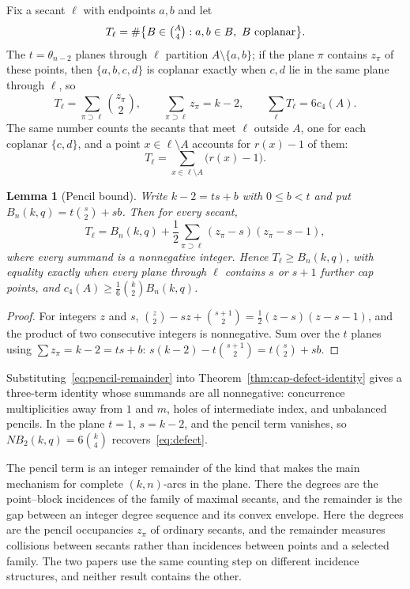 \documentclass[11pt]{article}
\newtheorem{lemma}[theorem]{Lemma}
\theoremstyle{definition}
\theoremstyle{remark}
\begin{document}
Fix a secant $\ell$ with endpoints $a,b$ and let
\[
 T_\ell=\#\bigl\{B\in\tbinom A4:a,b\in B,\ B\text{ coplanar}\bigr\}.
\]
The $t=\theta_{n-2}$ planes through $\ell$ partition $A\setminus\{a,b\}$;
if the plane $\pi$ contains $z_\pi$ of these points, then
$\{a,b,c,d\}$ is coplanar exactly when $c,d$ lie in the same plane through
$\ell$, so
\begin{equation}
 T_\ell=\sum_{\pi\supset\ell}\binom{z_\pi}2,
 \qquad
 \sum_{\pi\supset\ell}z_\pi=k-2,
 \qquad
 \sum_\ell T_\ell=6c_4(A).
\label{eq:pencil}
\end{equation}
The same number counts the secants that meet $\ell$ outside $A$, one for
each coplanar $\{c,d\}$, and a point $x\in\ell\setminus A$ accounts for
$r(x)-1$ of them:
\begin{equation}
 T_\ell=\sum_{x\in\ell\setminus A}\bigl(r(x)-1\bigr).
\label{eq:secant-collisions}
\end{equation}

\begin{lemma}[Pencil bound]
\label{lem:pencil-bound}
Write $k-2=ts+b$ with $0\le b<t$ and put
$B_n(k,q)=t\binom{s}{2}+sb$.  Then for every secant,
\begin{equation}
 T_\ell=B_n(k,q)+\frac12\sum_{\pi\supset\ell}(z_\pi-s)(z_\pi-s-1),
\label{eq:pencil-remainder}
\end{equation}
where every summand is a nonnegative integer.  Hence
$T_\ell\ge B_n(k,q)$, with equality exactly when every plane through
$\ell$ contains $s$ or $s+1$ further cap points, and
$c_4(A)\ge\frac16\binom{k}{2}B_n(k,q)$.
\end{lemma}

\begin{proof}
For integers $z$ and $s$,
$\binom z2-sz+\binom{s+1}2=\frac12(z-s)(z-s-1)$, and the product of two
consecutive integers is nonnegative.  Sum over the $t$ planes using
$\sum z_\pi=k-2=ts+b$:
$s(k-2)-t\binom{s+1}2=t\binom s2+sb$.
\end{proof}

Substituting~\eqref{eq:pencil-remainder} into
Theorem~\ref{thm:cap-defect-identity} gives a three-term identity whose
summands are all nonnegative: concurrence multiplicities away from $1$ and
$m$, holes of intermediate index, and unbalanced pencils.  In the plane
$t=1$, $s=k-2$, and the pencil term vanishes, so
$N B_2(k,q)=6\binom{k}{4}$ recovers~\eqref{eq:defect}.

The pencil term is an integer remainder of the kind that
\cite{RuddIntegralSecant} makes the main mechanism for complete
$(k,n)$-arcs in the plane.  There the degrees are the point--block
incidences of the family of maximal secants, and the remainder is the gap
between an integer degree sequence and its convex envelope.  Here the
degrees are the pencil occupancies $z_\pi$ of ordinary secants, and the
remainder measures collisions between secants rather than incidences
between points and a selected family.  The two papers use the same counting
step on different incidence structures, and neither result contains the
other.
\end{document}
